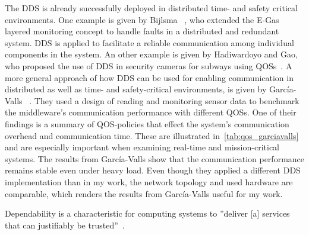 The \gls*{DDS} is already successfully deployed in distributed time- and safety critical environments.
One example is given by Bijlsma \etal~\cite{DistributedSafety2020}, who extended the E-Gas layered monitoring concept to handle faults in a distributed and redundant system.
\Gls*{DDS} is applied to facilitate a reliable communication among individual components in the system.
An other example is given by Hadiwardoyo and Gao, who proposed the use of \gls*{DDS} in security cameras for subways using \glspl*{QOS}~\cite{DDSInSubways}.
A more general approach of how \gls*{DDS} can be used for enabling communication in distributed as well as time- and safety-critical environments, is given by García-Valls \etal~\cite{GarciaVallsDDSInDistributed}.
They used a design of reading and monitoring sensor data to benchmark the middleware's communication performance with different \glspl*{QOS}.
One of their findings is a summary of \gls*{QOS}-policies that effect the system's communication overhead and communication time.
These are illustrated in~\autoref{tab:qos_garciavalls} and are especially important when examining real-time and mission-critical systems.
The results from García-Valls \etal show that the communication performance remains stable even under heavy load.
Even though they applied a different \gls*{DDS} implementation than in my work, the network topology and used hardware are comparable, which renders the results from García-Valls \etal useful for my work.


\iffalse










































Dependability is a characteristic for computing systems to ''deliver [a] services that can justifiably be trusted''~\cite{AvizienisDependability2001}.


